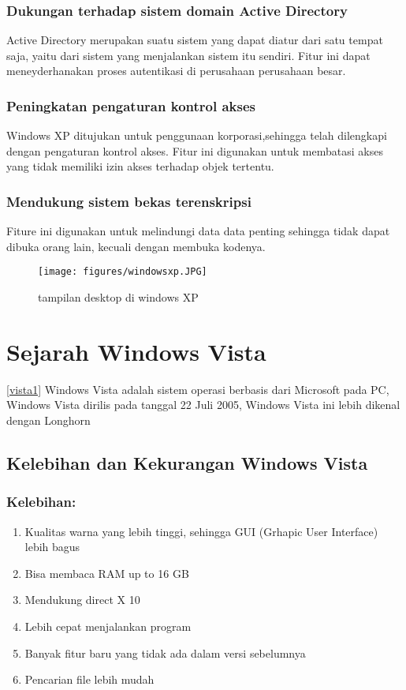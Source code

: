 \begin{enumerate}
			\subsubsection{Dukungan terhadap sistem domain Active Directory} 
				Active Directory merupakan suatu sistem yang dapat diatur dari satu tempat saja, yaitu dari sistem yang menjalankan sistem itu sendiri. Fitur ini dapat meneyderhanakan 	proses autentikasi di perusahaan perusahaan besar.
			\subsubsection{Peningkatan pengaturan kontrol akses}
				Windows XP ditujukan untuk penggunaan korporasi,sehingga telah dilengkapi dengan pengaturan kontrol akses. Fitur ini digunakan untuk membatasi akses yang tidak memiliki izin akses terhadap objek tertentu.
			\subsubsection{Mendukung sistem bekas terenskripsi}
				Fiture ini digunakan untuk melindungi data data penting sehingga tidak dapat dibuka orang lain, kecuali dengan membuka kodenya.

\begin{figure}[ht]
\centerline{\texttt{[image: figures/windowsxp.JPG]}}
\caption{tampilan desktop di windows XP}
\label{windowsxp}
\end{figure}
	\section{Sejarah Windows Vista}
\ref{vista1}
		Windows Vista adalah sistem operasi berbasis dari Microsoft pada PC, Windows Vista dirilis pada tanggal 22 Juli 2005, Windows Vista ini lebih dikenal dengan Longhorn
	\subsection{Kelebihan dan Kekurangan Windows Vista}  \cite{russinovich2009windows}
		\subsubsection{Kelebihan:}
\begin{enumerate}
			\item Kualitas warna yang lebih tinggi, sehingga GUI (Grhapic User Interface) lebih bagus
			\item Bisa membaca RAM up to 16 GB
			\item Mendukung direct X 10
			\item Lebih cepat menjalankan program
			\item Banyak fitur baru yang tidak ada dalam versi sebelumnya
			\item Pencarian file lebih mudah 
\end{enumerate}

\end{enumerate}
